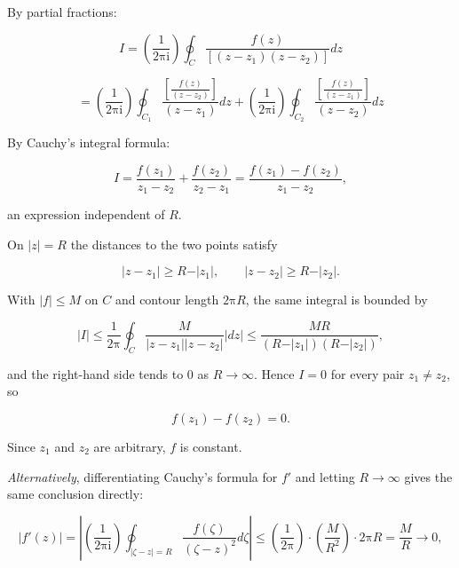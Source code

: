 \documentclass[11pt,a4paper]{article}
\theoremstyle{definition}
\theoremstyle{plain}
\begin{document}
By partial fractions:

\begin{equation}
I = \left(\frac{1}{2\mathrm{\pi}\mathrm{i}}\right)\oint_{C}\frac{f(z)}{[(z - z_{1})(z - z_{2})]}dz
\end{equation}

\[
= \left(\frac{1}{2\mathrm{\pi}\mathrm{i}}\right)\oint_{C_{1}}\frac{[\frac{f(z)}{(z - z_{2})}]}{(z - z_{1})}dz + \left(\frac{1}{2\mathrm{\pi}\mathrm{i}}\right)\oint_{C_{2}}\frac{[\frac{f(z)}{(z - z_{1})}]}{(z - z_{2})}dz
\]

By Cauchy's integral formula:

\begin{equation}
I = \frac{f(z_{1})}{z_{1} - z_{2}} + \frac{f(z_{2})}{z_{2} - z_{1}}
= \frac{f(z_{1}) - f(z_{2})}{z_{1} - z_{2}} ,
\end{equation}

an expression independent of $R$.

On $\vert{}z\vert{} = R$ the distances to the two points satisfy

\begin{equation}
\vert{}z - z_{1}\vert{} \ge R - \vert{}z_{1}\vert{}, \qquad
\vert{}z - z_{2}\vert{} \ge R - \vert{}z_{2}\vert{} .
\end{equation}

With $\vert{}f\vert{} \le M$ on $C$ and contour length $2\mathrm{\pi}R$, the same integral is
bounded by

\begin{equation}
\vert{}I\vert{} \le \frac{1}{2\mathrm{\pi}}\oint_{C}\frac{M}{\vert{}z - z_{1}\vert{}\vert{}z - z_{2}\vert{}}\vert{}dz\vert{}
\le \frac{MR}{(R - \vert{}z_{1}\vert{})(R - \vert{}z_{2}\vert{})},
\end{equation}

and the right-hand side tends to $0$ as $R \to \infty$. Hence $I = 0$ for every
pair $z_{1} \ne z_{2}$, so

\begin{equation}
f(z_{1}) - f(z_{2}) = 0 .
\end{equation}

Since $z_{1}$ and $z_{2}$ are arbitrary, $f$ is constant.

\textit{Alternatively}, differentiating Cauchy's formula for $f'$ and letting
$R \to \infty$ gives the same conclusion directly:

\begin{equation}
\vert{}f'(z)\vert{} = \left\vert{}\left(\frac{1}{2\mathrm{\pi}\mathrm{i}}\right)\oint_{\vert{}\zeta - z\vert{} = R}\frac{f(\zeta)}{(\zeta - z)^{2}}d\zeta\right\vert{}
\le \left(\frac{1}{2\mathrm{\pi}}\right)\cdot\left(\frac{M}{R^{2}}\right)\cdot 2\mathrm{\pi}R = \frac{M}{R} \to 0 ,
\end{equation}
\end{document}
